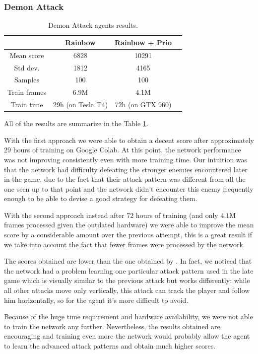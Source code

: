 \documentclass[10pt,twocolumn,letterpaper]{article}
\begin{document}
\subsubsection{Demon Attack}

\begin{table}
	\begin{center}
		\begin{tabular}{ |c|c|c|c| } 
			\hline
			& Rainbow & Rainbow + Prio \\ 
			\hline
			Mean score & 6828 & 10291\\
			Std dev. & 1812 & 4165\\
			Samples & 100 & 100\\
			Train frames & 6.9M & 4.1M\\
			Train time & 29h (on Tesla T4) & 72h (on GTX 960)\\
			\hline
		\end{tabular}
	\end{center}
	\caption{Demon Attack agents results.}
	\label{tab:da_result}
\end{table}
All of the results are summarize in the Table \ref{tab:da_result}.

With the first approach we were able to obtain a decent score after approximately $29$ hours of training on Google Colab. At this point, the network performance was not improving consistently even with more training time. Our intuition was that the network had difficulty defeating the stronger enemies encountered later in the game, due to the fact that their attack pattern was different from all the one seen up to that point and the network didn't encounter this enemy frequently enough to be able to devise a good strategy for defeating them.

With the second approach instead after $72$ hours of training (and only $4.1$M frames processed given the outdated hardware) we were able to improve the mean score by a considerable amount over the previous attempt, this is a great result if we take into account the fact that fewer frames were processed by the network.

The scores obtained are lower than the one obtained by \cite{DBLP:journals/corr/abs-1710-02298}. In fact, we noticed that the network had a problem learning one particular attack pattern used in the late game which is visually similar to the previous attack but works differently: while all other attacks move only vertically, this attack can track the player and follow him horizontally, so for the agent it's more difficult to avoid.

Because of the huge time requirement and hardware availability, we were not able to train the network any further. Nevertheless, the results obtained are encouraging and training even more the network would probably allow the agent to learn the advanced attack patterns and obtain much higher scores.

{\small


}
\end{document}
